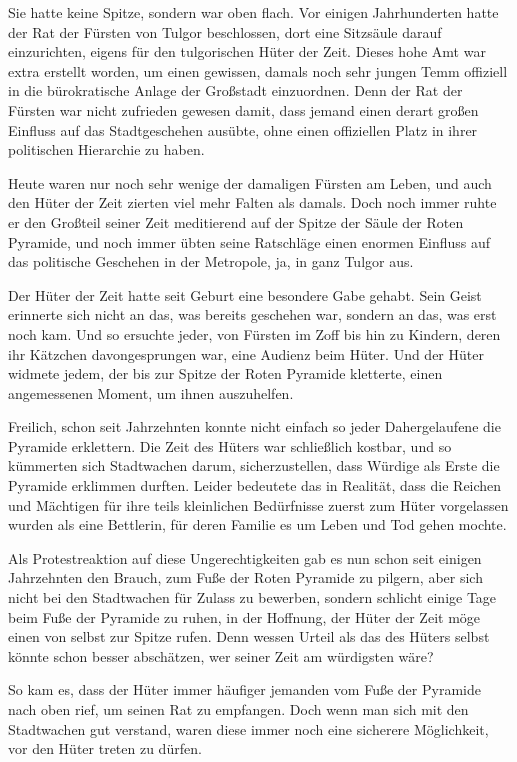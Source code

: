 Sie hatte keine Spitze, sondern war oben flach. Vor einigen Jahrhunderten hatte der Rat der Fürsten von Tulgor beschlossen, dort eine Sitzsäule darauf einzurichten, eigens für den tulgorischen Hüter der Zeit. Dieses hohe Amt war extra erstellt worden, um einen gewissen, damals noch sehr jungen Temm offiziell in die bürokratische Anlage der Großstadt einzuordnen. Denn der Rat der Fürsten war nicht zufrieden gewesen damit, dass jemand einen derart großen Einfluss auf das Stadtgeschehen ausübte, ohne einen offiziellen Platz in ihrer politischen Hierarchie zu haben.

Heute waren nur noch sehr wenige der damaligen Fürsten am Leben, und auch den Hüter der Zeit zierten viel mehr Falten als damals. Doch noch immer ruhte er den Großteil seiner Zeit meditierend auf der Spitze der Säule der Roten Pyramide, und noch immer übten seine Ratschläge einen enormen Einfluss auf das politische Geschehen in der Metropole, ja, in ganz Tulgor aus.

Der Hüter der Zeit hatte seit Geburt eine besondere Gabe gehabt. Sein Geist erinnerte sich nicht an das, was bereits geschehen war, sondern an das, was erst noch kam. Und so ersuchte jeder, von Fürsten im Zoff bis hin zu Kindern, deren ihr Kätzchen davongesprungen war, eine Audienz beim Hüter. Und der Hüter widmete jedem, der bis zur Spitze der Roten Pyramide kletterte, einen angemessenen Moment, um ihnen auszuhelfen.

Freilich, schon seit Jahrzehnten konnte nicht einfach so jeder Dahergelaufene die Pyramide erklettern. Die Zeit des Hüters war schließlich kostbar, und so kümmerten sich Stadtwachen darum, sicherzustellen, dass Würdige als Erste die Pyramide erklimmen durften. Leider bedeutete das in Realität, dass die Reichen und Mächtigen für ihre teils kleinlichen Bedürfnisse zuerst zum Hüter vorgelassen wurden als eine Bettlerin, für deren Familie es um Leben und Tod gehen mochte.

Als Protestreaktion auf diese Ungerechtigkeiten gab es nun schon seit einigen Jahrzehnten den Brauch, zum Fuße der Roten Pyramide zu pilgern, aber sich nicht bei den Stadtwachen für Zulass zu bewerben, sondern schlicht einige Tage beim Fuße der Pyramide zu ruhen, in der Hoffnung, der Hüter der Zeit möge einen von selbst zur Spitze rufen. Denn wessen Urteil als das des Hüters selbst könnte schon besser abschätzen, wer seiner Zeit am würdigsten wäre?

So kam es, dass der Hüter immer häufiger jemanden vom Fuße der Pyramide nach oben rief, um seinen Rat zu empfangen. Doch wenn man sich mit den Stadtwachen gut verstand, waren diese immer noch eine sicherere Möglichkeit, vor den Hüter treten zu dürfen.

